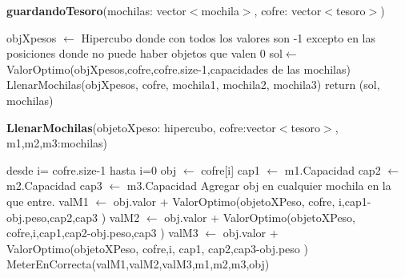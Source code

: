 \documentclass[spanish,12pt]{article}
\begin{document}
\begin{algorithm}[H]{\textbf{guardandoTesoro}(mochilas: vector$<$mochila$>$, cofre: vector$<$tesoro$>$)}
	\begin{algorithmic}[1]
		\State objXpesos $\gets$ Hipercubo donde con todos los valores son -1 excepto en las posiciones donde no puede haber objetos que valen  0 %
		\State sol$\gets$ ValorOptimo(objXpesos,cofre,cofre.size-1,capacidades de las mochilas)
		\State LlenarMochilas(objXpesos, cofre, mochila1, mochila2, mochila3)
		\State return (sol, mochilas)
	\end{algorithmic}
\end{algorithm}



\begin{algorithm}[H]{\textbf{LlenarMochilas}(objetoXpeso: hipercubo, cofre:vector$<$tesoro$>$, m1,m2,m3:mochilas)}
	\begin{algorithmic}[1]
		\State desde i= cofre.size-1 hasta i=0
			\State obj $\gets$ cofre[i]
			\State cap1 $\gets$ m1.Capacidad
			\State cap2 $\gets$ m2.Capacidad
			\State cap3 $\gets$ m3.Capacidad
			\If{$i=0$}
				\State Agregar obj en cualquier mochila en la que entre.
			\Else
				\State valM1 $\gets$ obj.valor + ValorOptimo(objetoXPeso, cofre, i,cap1-obj.peso,cap2,cap3 )
				\State valM2 $\gets$ obj.valor + ValorOptimo(objetoXPeso, cofre,i,cap1,cap2-obj.peso,cap3 )
				\State valM3 $\gets$ obj.valor + ValorOptimo(objetoXPeso, cofre,i, cap1, cap2,cap3-obj.peso )
				\State MeterEnCorrecta(valM1,valM2,valM3,m1,m2,m3,obj)
			\EndIf

	\end{algorithmic}
\end{algorithm}



\end{document}
